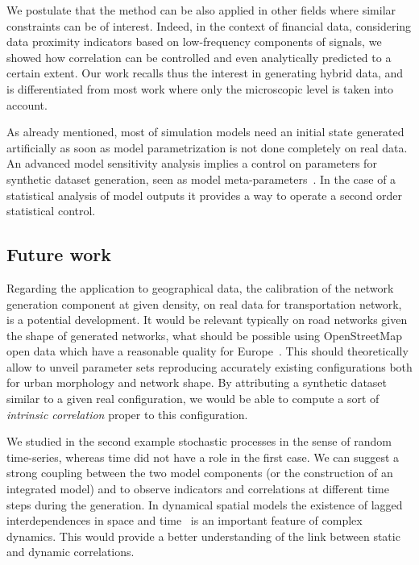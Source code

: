 \documentclass{bmcart}
\begin{document}
We postulate that the method can be also applied in other fields where similar constraints can be of interest. Indeed, in the context of financial data, considering data proximity indicators based on low-frequency components of signals, we showed how correlation can be controlled and even analytically predicted to a certain extent. Our work recalls thus the interest in generating hybrid data, and is differentiated from most work where only the microscopic level is taken into account.

As already mentioned, most of simulation models need an initial state generated artificially as soon as model parametrization is not done completely on real data. An advanced model sensitivity analysis implies a control on parameters for synthetic dataset generation, seen as model meta-parameters~\cite{raimbault2018space}. In the case of a statistical analysis of model outputs it provides a way to operate a second order statistical control.

\subsection*{Future work}


Regarding the application to geographical data, the calibration of the network generation component at given density, on real data for transportation network, is a potential development. It would be relevant typically on road networks given the shape of generated networks, what should be possible using OpenStreetMap open data which have a reasonable quality for Europe~\cite{girres2010quality}. This should theoretically allow to unveil parameter sets reproducing accurately existing configurations both for urban morphology and network shape. By attributing a synthetic dataset similar to a given real configuration, we would be able to compute a sort of \emph{intrinsic correlation} proper to this configuration.


We studied in the second example stochastic processes in the sense of random time-series, whereas time did not have a role in the first case. We can suggest a strong coupling between the two model components (or the construction of an integrated model) and to observe indicators and correlations at different time steps during the generation. In dynamical spatial models the existence of lagged interdependences in space and time~\cite{pigozzi1980interurban} is an important feature of complex dynamics. This would provide a better understanding of the link between static and dynamic correlations.
\end{document}
